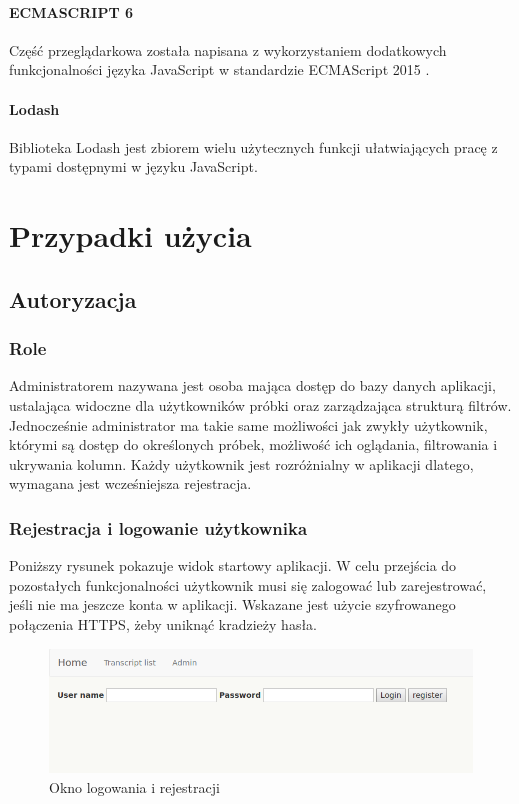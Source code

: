 \documentclass[a4paper,12pt,twoside]{article}
\begin{document}
\paragraph{ECMASCRIPT 6} Część przeglądarkowa została napisana z wykorzystaniem
dodatkowych funkcjonalności języka JavaScript w standardzie ECMAScript 2015 \cite{ecma}.

\paragraph{Lodash} Biblioteka Lodash \cite{lodash} jest zbiorem wielu użytecznych funkcji ułatwiających pracę z typami dostępnymi w języku JavaScript.

\newpage

\section{Przypadki użycia}
\subsection{Autoryzacja} 
\subsubsection{Role}
Administratorem nazywana jest osoba mająca dostęp do bazy danych aplikacji, ustalająca
widoczne dla użytkowników próbki oraz zarządzająca strukturą filtrów.
Jednocześnie administrator ma takie same możliwości jak zwykły użytkownik, którymi są dostęp do określonych próbek, możliwość ich oglądania, filtrowania i ukrywania kolumn.
Każdy użytkownik jest rozróżnialny w aplikacji dlatego, wymagana jest wcześniejsza rejestracja.

\subsubsection{Rejestracja i logowanie użytkownika}
Poniższy rysunek pokazuje widok startowy aplikacji. W celu przejścia do pozostałych funkcjonalności użytkownik musi się zalogować lub zarejestrować, jeśli nie ma jeszcze
konta w aplikacji. Wskazane jest użycie szyfrowanego połączenia HTTPS, żeby uniknąć
kradzieży hasła.

\begin{figure}[h!]
\includegraphics[width=\linewidth]{obrazy/aplikacja/login.png}
\caption{Okno logowania i rejestracji}
\label{fig:loginpic}
\end{figure}
\end{document}
